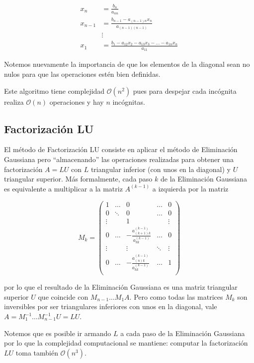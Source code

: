 \begin{align*}
x_n &= \frac{b_n}{a_{nn}}	\\
x_{n - 1} &= \frac{b_{n - 1} - a_{(n-1)n} x_n}{a_{(n-1)(n-1)}}	\\
&\vdots \\
x_1 &= \frac{b_1 - a_{12}x_2 - a_{13}x_3 - \ldots - a_{1n} x_n}{a_{11}}
\end{align*}

Notemos nuevamente la importancia de que los elementos de la diagonal sean no nulos para que las operaciones estén bien definidas.

Este algoritmo tiene complejidad $\mathcal{O}(n^2)$ pues para despejar cada incógnita realiza $\mathcal{O}(n)$ operaciones y hay $n$ incógnitas.

\subsection{Factorización LU}

El método de Factorización LU consiste en aplicar el método de Eliminación Gaussiana pero ``almacenando'' las operaciones realizadas para obtener una factorización $A = LU$ con $L$ triangular inferior (con unos en la diagonal) y $U$ triangular superior. Más formalmente, cada paso $k$ de la Eliminación Gaussiana es equivalente a multiplicar a la matriz $A^{(k-1)}$ a izquierda por la matriz

\[
M_k = 
\begin{pmatrix} 
1 		& \ldots 	& 0 				& \ldots 	& 0 \\
0 		& \ddots 	& 0 				& \ldots 	& 0 \\
\vdots 	& 			& 1 				& 			& \vdots\\
0		& \ldots		& -\frac{a_{(k+1)k}^{(k - 1)}}{a_{kk}^{(k - 1)}} 	& \ldots		& 0\\
\vdots	& 			& \vdots		 	& \ddots		& \vdots\\
0		& \ldots		& -\frac{a_{(n)k}^{(k - 1)}}{a_{kk}^{(k - 1)}}	& \ldots		& 1\\
\end{pmatrix}
\]

por lo que el resultado de la Eliminación Gaussiana es una matriz triangular superior $U$ que coincide con $M_{n-1} \ldots M_1 A$. Pero como todas las matrices $M_k$ son inversibles por ser triangulares inferiores con unos en la diagonal, vale $A = M_1^{-1}\ldots M_{n - 1}^{-1} U = LU$.

Notemos que es posible ir armando $L$ a cada paso de la Eliminación Gaussiana por lo que la complejidad computacional se mantiene: computar la factorización $LU$ toma también $\mathcal{O}(n^3)$.

